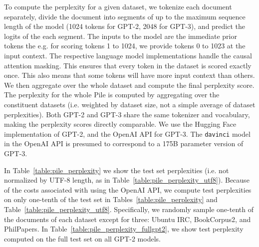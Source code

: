 \documentclass[11pt,a4paper]{article}
\begin{document}
\begin{appendices}
To compute the perplexity for a given dataset, we tokenize each document separately, divide the document into segments of up to the maximum sequence length of the model (1024 tokens for GPT-2, 2048 for GPT-3), and predict the logits of the each segment.
The inputs to the model are the immediate prior tokens the e.g. for scoring tokens 1 to 1024, we provide tokens 0 to 1023 at the input context.
The respective language model implementations handle the causal attention masking.
This ensures that every token in the dataset is scored exactly once.
This also means that some tokens will have more input context than others.
We then aggregate over the whole dataset and compute the final perplexity score.
The perplexity for the whole Pile is computed by aggregating over the constituent datasets (i.e. weighted by dataset size, not a simple average of dataset perplexities).
Both GPT-2 and GPT-3 share the same tokenizer and vocabulary, making the perplexity scores directly comparable. 
We use the Hugging Face \citep{wolf2020transformers} implementation of GPT-2, and the OpenAI API for GPT-3. The \texttt{davinci} model in the OpenAI API is presumed to correspond to a 175B parameter version of GPT-3.

In Table~\ref{table:pile_perplexity} we show the test set perplexities (i.e. not normalized by UTF-8 length, as in Table~\ref{table:pile_perplexity_utf8}). 
Because of the costs associated with using the OpenAI API, we compute test perplexities on only one-tenth of the test set in Tables~\ref{table:pile_perplexity} and Table~\ref{table:pile_perplexity_utf8}. Specifically, we randomly sample one-tenth of the documents of each dataset except for three: Ubuntu IRC, BookCorpus2, and PhilPapers. In Table~\ref{table:pile_perplexity_fullgpt2}, we show test perplexity computed on the full test set on all GPT-2 models.


\end{appendices}
\end{document}
